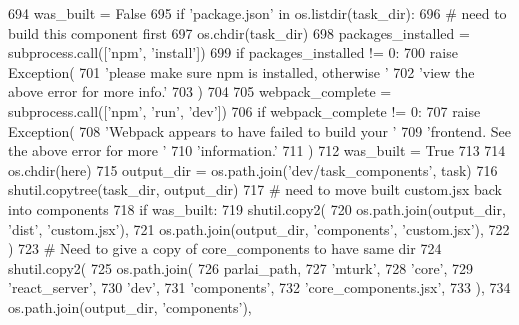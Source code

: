 \begin{DoxyCode}
694         was\_built = \textcolor{keyword}{False}
695         \textcolor{keywordflow}{if} \textcolor{stringliteral}{'package.json'} \textcolor{keywordflow}{in} os.listdir(task\_dir):
696             \textcolor{comment}{# need to build this component first}
697             os.chdir(task\_dir)
698             packages\_installed = subprocess.call([\textcolor{stringliteral}{'npm'}, \textcolor{stringliteral}{'install'}])
699             \textcolor{keywordflow}{if} packages\_installed != 0:
700                 \textcolor{keywordflow}{raise} Exception(
701                     \textcolor{stringliteral}{'please make sure npm is installed, otherwise '}
702                     \textcolor{stringliteral}{'view the above error for more info.'}
703                 )
704 
705             webpack\_complete = subprocess.call([\textcolor{stringliteral}{'npm'}, \textcolor{stringliteral}{'run'}, \textcolor{stringliteral}{'dev'}])
706             \textcolor{keywordflow}{if} webpack\_complete != 0:
707                 \textcolor{keywordflow}{raise} Exception(
708                     \textcolor{stringliteral}{'Webpack appears to have failed to build your '}
709                     \textcolor{stringliteral}{'frontend. See the above error for more '}
710                     \textcolor{stringliteral}{'information.'}
711                 )
712             was\_built = \textcolor{keyword}{True}
713 
714         os.chdir(here)
715         output\_dir = os.path.join(\textcolor{stringliteral}{'dev/task\_components'}, task)
716         shutil.copytree(task\_dir, output\_dir)
717         \textcolor{comment}{# need to move built custom.jsx back into components}
718         \textcolor{keywordflow}{if} was\_built:
719             shutil.copy2(
720                 os.path.join(output\_dir, \textcolor{stringliteral}{'dist'}, \textcolor{stringliteral}{'custom.jsx'}),
721                 os.path.join(output\_dir, \textcolor{stringliteral}{'components'}, \textcolor{stringliteral}{'custom.jsx'}),
722             )
723         \textcolor{comment}{# Need to give a copy of core\_components to have same dir}
724         shutil.copy2(
725             os.path.join(
726                 parlai\_path,
727                 \textcolor{stringliteral}{'mturk'},
728                 \textcolor{stringliteral}{'core'},
729                 \textcolor{stringliteral}{'react\_server'},
730                 \textcolor{stringliteral}{'dev'},
731                 \textcolor{stringliteral}{'components'},
732                 \textcolor{stringliteral}{'core\_components.jsx'},
733             ),
734             os.path.join(output\_dir, \textcolor{stringliteral}{'components'}),

\end{DoxyCode}

